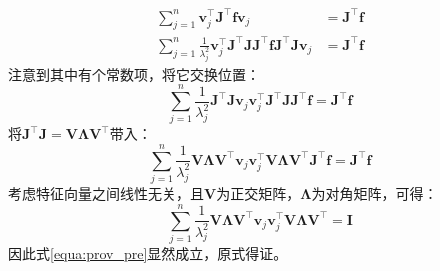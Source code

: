 \documentclass[oneside]{article}
\begin{document}
\begin{align}
    \sum_{j=1}^{n} \mathbf{v}_{j}^{\top} \mathbf{J} ^ \top  \mathbf{f}  \mathbf{v}_{j} &= \mathbf{J} ^\top  \mathbf{f} \\
    \sum_{j=1}^{n} \frac{1}{\lambda_{j} ^2}\mathbf{v}_{j}^{\top} \mathbf{J} ^ \top \mathbf{J} \mathbf{J} ^ \top  \mathbf{f}  \mathbf{J} ^ \top \mathbf{J} \mathbf{v}_{j} &= \mathbf{J} ^\top  \mathbf{f}
\end{align}
注意到其中有个常数项，将它交换位置：
\begin{equation}
    \sum_{j=1}^{n} \frac{1}{\lambda_{j} ^2}  \mathbf{J} ^ \top \mathbf{J} \mathbf{v}_{j} \mathbf{v}_{j}^{\top} \mathbf{J} ^ \top \mathbf{J} \mathbf{J} ^ \top  \mathbf{f} = \mathbf{J} ^\top  \mathbf{f}     
\end{equation}
将$\mathbf{J}^{\top} \mathbf{J}=\mathbf{V} \bm{\mathbf{\Lambda}} \mathbf{V}^{\top}$带入：
\begin{equation}
    \sum_{j=1}^{n} \frac{1}{\lambda_{j} ^2}  \mathbf{V} \bm{\mathbf{\Lambda}} \mathbf{V}^{\top} \mathbf{v}_{j} \mathbf{v}_{j}^{\top} \mathbf{V} \bm{\mathbf{\Lambda}} \mathbf{V}^{\top} \mathbf{J} ^ \top  \mathbf{f} = \mathbf{J} ^\top  \mathbf{f}     
    \label{equa:prov_pre}
\end{equation}
考虑特征向量之间线性无关，且$\mathbf{V}$为正交矩阵，$\bm{\mathbf{\Lambda}}$为对角矩阵，可得：
\begin{equation}
    \sum_{j=1}^{n} \frac{1}{\lambda_{j} ^2}  \mathbf{V} \bm{\mathbf{\Lambda}} \mathbf{V}^{\top} \mathbf{v}_{j} \mathbf{v}_{j}^{\top} \mathbf{V} \bm{\mathbf{\Lambda}} \mathbf{V}^{\top} = \mathbf{I} 
\end{equation}
因此式\ref{equa:prov_pre}显然成立，原式得证。
\end{document}
